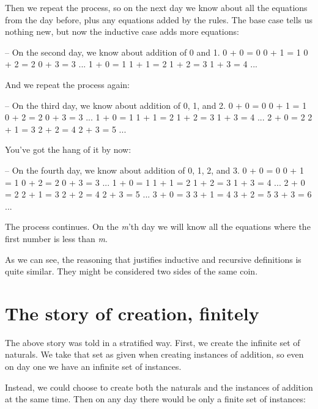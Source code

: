 Then we repeat the process, so on the next day we know about all the
equations from the day before, plus any equations added by the rules.
The base case tells us nothing new, but now the inductive case adds more
equations:

\begin{myDisplay}
-- On the second day, we know about addition of 0 and 1.
0 + 0 = 0     0 + 1 = 1     0 + 2 = 2     0 + 3 = 3     ...
1 + 0 = 1     1 + 1 = 2     1 + 2 = 3     1 + 3 = 4     ...
\end{myDisplay}

And we repeat the process again:

\begin{myDisplay}
-- On the third day, we know about addition of 0, 1, and 2.
0 + 0 = 0     0 + 1 = 1     0 + 2 = 2     0 + 3 = 3     ...
1 + 0 = 1     1 + 1 = 2     1 + 2 = 3     1 + 3 = 4     ...
2 + 0 = 2     2 + 1 = 3     2 + 2 = 4     2 + 3 = 5     ...
\end{myDisplay}

You've got the hang of it by now:

\begin{myDisplay}
-- On the fourth day, we know about addition of 0, 1, 2, and 3.
0 + 0 = 0     0 + 1 = 1     0 + 2 = 2     0 + 3 = 3     ...
1 + 0 = 1     1 + 1 = 2     1 + 2 = 3     1 + 3 = 4     ...
2 + 0 = 2     2 + 1 = 3     2 + 2 = 4     2 + 3 = 5     ...
3 + 0 = 3     3 + 1 = 4     3 + 2 = 5     3 + 3 = 6     ...
\end{myDisplay}

The process continues. On the \emph{m}'th day we will know all the
equations where the first number is less than \emph{m}.

As we can see, the reasoning that justifies inductive and recursive
definitions is quite similar. They might be considered two sides of the
same coin.

\hypertarget{Naturals-finite-creation}{%
\section{The story of creation,
finitely}\label{Naturals-finite-creation}}

The above story was told in a stratified way. First, we create the
infinite set of naturals. We take that set as given when creating
instances of addition, so even on day one we have an infinite set of
instances.

Instead, we could choose to create both the naturals and the instances
of addition at the same time. Then on any day there would be only a
finite set of instances:

